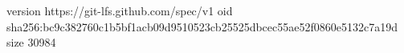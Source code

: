 version https://git-lfs.github.com/spec/v1
oid sha256:bc9c382760c1b5bf1acb09d9510523cb25525dbcec55ae52f0860e5132c7a19d
size 30984
